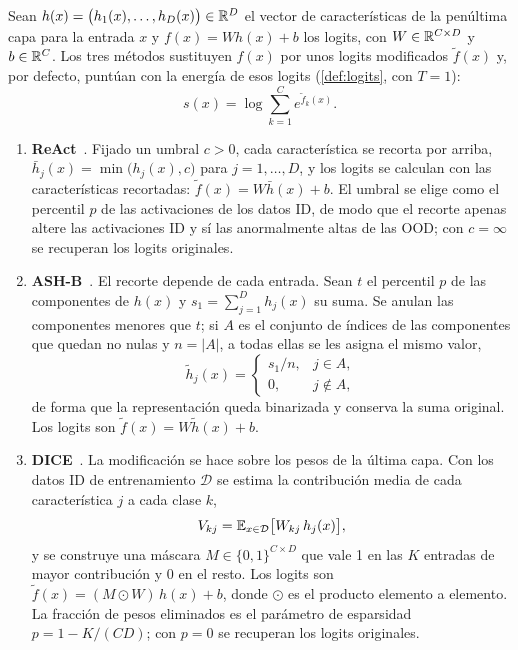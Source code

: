 \begin{definicion}\label{def:activaciones}
Sean $h(x) = \bigl(h_1(x), \dots, h_D(x)\bigr) \in \mathbb{R}^D$ el vector de características de la penúltima capa para la entrada $x$ y $f(x) = W h(x) + b$ los logits, con $W \in \mathbb{R}^{C \times D}$ y $b \in \mathbb{R}^C$. Los tres métodos sustituyen $f(x)$ por unos logits modificados $\tilde f(x)$ y, por defecto, puntúan con la energía de esos logits (\cref{def:logits}, con $T = 1$):
\[
  s(x) = \log \sum_{k=1}^{C} e^{\tilde f_k(x)} .
\]
\begin{enumerate}
  \item \textbf{ReAct}~\cite[sec.~3]{sun2021react}. Fijado un umbral $c > 0$, cada característica se recorta por arriba, $\bar h_j(x) = \min\bigl(h_j(x), c\bigr)$ para $j = 1, \dots, D$, y los logits se calculan con las características recortadas: $\tilde f(x) = W \bar h(x) + b$. El umbral se elige como el percentil $p$ de las activaciones de los datos ID, de modo que el recorte apenas altere las activaciones ID y sí las anormalmente altas de las OOD; con $c = \infty$ se recuperan los logits originales.
  \item \textbf{ASH-B}~\cite[sec.~3, alg.~2]{djurisic2023}. El recorte depende de cada entrada. Sean $t$ el percentil $p$ de las componentes de $h(x)$ y $s_1 = \sum_{j=1}^{D} h_j(x)$ su suma. Se anulan las componentes menores que $t$; si $A$ es el conjunto de índices de las componentes que quedan no nulas y $n = |A|$, a todas ellas se les asigna el mismo valor,
  \[
    \tilde h_j(x) =
    \begin{cases}
      s_1 / n, & j \in A,\\
      0, & j \notin A,
    \end{cases}
  \]
  de forma que la representación queda binarizada y conserva la suma original. Los logits son $\tilde f(x) = W \tilde h(x) + b$.
  \item \textbf{DICE}~\cite[sec.~3]{sun2022dice}. La modificación se hace sobre los pesos de la última capa. Con los datos ID de entrenamiento $\mathcal{D}$ se estima la contribución media de cada característica $j$ a cada clase $k$,
  \[
    V_{kj} = \operatorname{\mathbb{E}}_{x \in \mathcal{D}}\bigl[W_{kj}\, h_j(x)\bigr],
  \]
  y se construye una máscara $M \in \{0, 1\}^{C \times D}$ que vale 1 en las $K$ entradas de mayor contribución y $0$ en el resto. Los logits son $\tilde f(x) = (M \odot W)\, h(x) + b$, donde $\odot$ es el producto elemento a elemento. La fracción de pesos eliminados es el parámetro de esparsidad $p = 1 - K/(CD)$; con $p = 0$ se recuperan los logits originales.
\end{enumerate}
\end{definicion}

